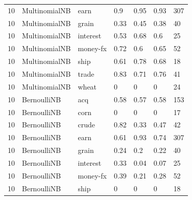 \documentclass{article}
\begin{document}
\begin{table}[h]
\begin{tabular}{lllllll}
10            & MultinomialNB          & earn            & 0.9                & 0.95            & 0.93              & 307              \\
10            & MultinomialNB          & grain           & 0.33               & 0.45            & 0.38              & 40               \\
10            & MultinomialNB          & interest        & 0.53               & 0.68            & 0.6               & 25               \\
10            & MultinomialNB          & money-fx        & 0.72               & 0.6             & 0.65              & 52               \\
10            & MultinomialNB          & ship            & 0.61               & 0.78            & 0.68              & 18               \\
10            & MultinomialNB          & trade           & 0.83               & 0.71            & 0.76              & 41               \\
10            & MultinomialNB          & wheat           & 0                  & 0               & 0                 & 24               \\
10            & BernoulliNB            & acq             & 0.58               & 0.57            & 0.58              & 153              \\
10            & BernoulliNB            & corn            & 0                  & 0               & 0                 & 17               \\
10            & BernoulliNB            & crude           & 0.82               & 0.33            & 0.47              & 42               \\
10            & BernoulliNB            & earn            & 0.61               & 0.93            & 0.74              & 307              \\
10            & BernoulliNB            & grain           & 0.24               & 0.2             & 0.22              & 40               \\
10            & BernoulliNB            & interest        & 0.33               & 0.04            & 0.07              & 25               \\
10            & BernoulliNB            & money-fx        & 0.39               & 0.21            & 0.28              & 52               \\
10            & BernoulliNB            & ship            & 0                  & 0               & 0                 & 18               \\

\end{tabular}
\end{table}
\end{document}
